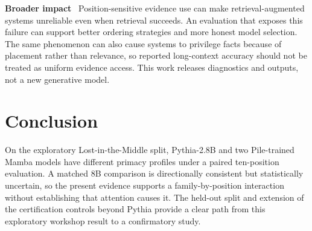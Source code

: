 \documentclass{article}
\newcommand{\runin}[1]{\par\medskip\noindent\textbf{#1}\ }
\begin{document}
\runin{Broader impact}
Position-sensitive evidence use can make retrieval-augmented systems unreliable even when retrieval succeeds.
An evaluation that exposes this failure can support better ordering strategies and more honest model selection.
The same phenomenon can also cause systems to privilege facts because of placement rather than relevance, so reported long-context accuracy should not be treated as uniform evidence access.
This work releases diagnostics and outputs, not a new generative model.

\section{Conclusion}
\label{sec:conclusion}

On the exploratory Lost-in-the-Middle split, Pythia-2.8B and two Pile-trained Mamba models have different primacy profiles under a paired ten-position evaluation.
A matched 8B comparison is directionally consistent but statistically uncertain, so the present evidence supports a family-by-position interaction without establishing that attention causes it.
The held-out split and extension of the certification controls beyond Pythia provide a clear path from this exploratory workshop result to a confirmatory study.
\end{document}
